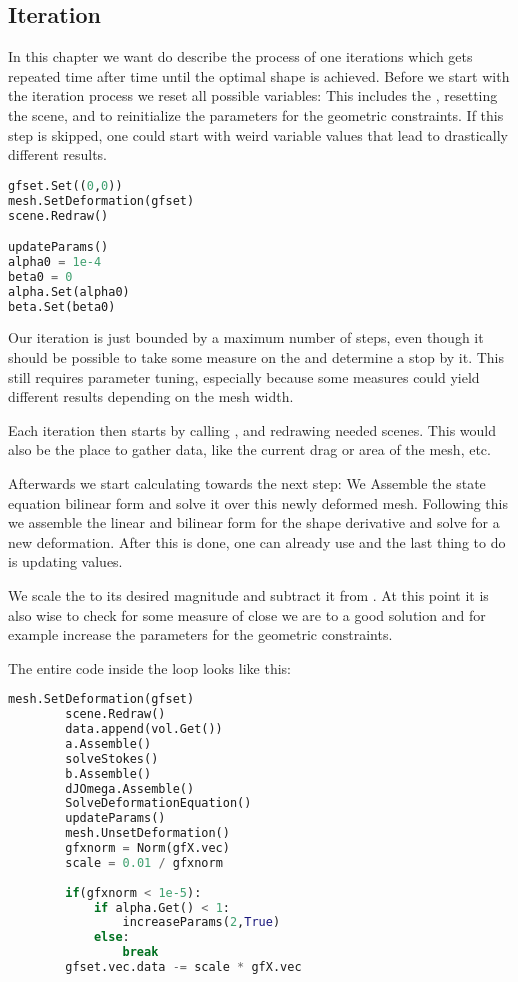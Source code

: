 \subsection{Iteration}
In this chapter we want do describe the process of one iterations which gets repeated time after time until the optimal shape is achieved.
Before we start with the iteration process we reset all possible variables:
This includes the , resetting the scene, and to reinitialize the parameters for the geometric constraints. If this step is skipped, one could start with weird variable values that lead to drastically different results.

\begin{lstlisting}[language=Python, title=Reset before iteration, label=lst:reset]
gfset.Set((0,0))
mesh.SetDeformation(gfset)
scene.Redraw()

updateParams()
alpha0 = 1e-4
beta0 = 0
alpha.Set(alpha0)
beta.Set(beta0)
\end{lstlisting}

Our iteration is just bounded by a maximum number of steps, even though it should be possible to take some measure on the  and determine a stop by it.
This still requires parameter tuning, especially because some measures could yield different results depending on the mesh width.

Each iteration then starts by calling , and redrawing needed scenes. This would also be the place to gather data, like the current drag or area of the mesh, etc.

Afterwards we start calculating towards the next step:
We Assemble the state equation bilinear form and solve it over this newly deformed mesh. Following this we assemble the linear and bilinear form for the shape derivative and solve for a new deformation. After this is done, one can already use  and the last thing to do is updating values.

We scale the  to its desired magnitude and subtract it from . At this point it is also wise to check for some measure of close we are to a good solution and for example increase the parameters for the geometric constraints.

The entire code inside the loop looks like this:

\begin{lstlisting}[language=Python, title=Iteration, label=lst:loop]
		mesh.SetDeformation(gfset)
		scene.Redraw()
		data.append(vol.Get())
		a.Assemble()
		solveStokes()
		b.Assemble()
		dJOmega.Assemble()
		SolveDeformationEquation()
		updateParams()
		mesh.UnsetDeformation()
		gfxnorm = Norm(gfX.vec)
		scale = 0.01 / gfxnorm
		
		if(gfxnorm < 1e-5):
			if alpha.Get() < 1:
				increaseParams(2,True)
			else:
				break
		gfset.vec.data -= scale * gfX.vec
\end{lstlisting}